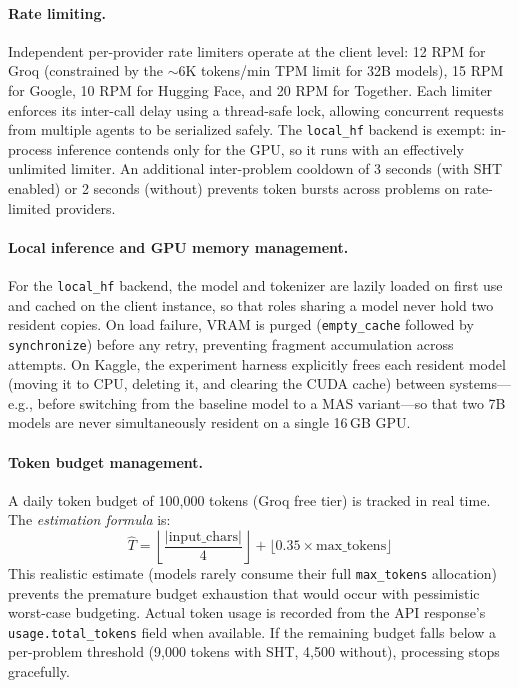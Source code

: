 \documentclass[11pt,a4paper]{article}
\begin{document}
\paragraph{Rate limiting.}
Independent per-provider rate limiters operate at the client level: 12 RPM for Groq (constrained by the $\sim$6K tokens/min TPM limit for 32B models), 15 RPM for Google, 10 RPM for Hugging Face, and 20 RPM for Together.
Each limiter enforces its inter-call delay using a thread-safe lock, allowing concurrent requests from multiple agents to be serialized safely.
The \texttt{local\_hf} backend is exempt: in-process inference contends only for the GPU, so it runs with an effectively unlimited limiter.
An additional inter-problem cooldown of 3 seconds (with SHT enabled) or 2 seconds (without) prevents token bursts across problems on rate-limited providers.
\paragraph{Local inference and GPU memory management.}
For the \texttt{local\_hf} backend, the model and tokenizer are lazily loaded on first use and cached on the client instance, so that roles sharing a model never hold two resident copies.
On load failure, VRAM is purged (\texttt{empty\_cache} followed by \texttt{synchronize}) before any retry, preventing fragment accumulation across attempts.
On Kaggle, the experiment harness explicitly frees each resident model (moving it to CPU, deleting it, and clearing the CUDA cache) between systems---e.g., before switching from the baseline model to a MAS variant---so that two 7B models are never simultaneously resident on a single 16\,GB GPU.
\paragraph{Token budget management.}
A daily token budget of 100,000 tokens (Groq free tier) is tracked in real time.
The \emph{estimation formula} is:
\begin{equation*}
\hat{T} = \left\lfloor \frac{|\text{input\_chars}|}{4} \right\rfloor + \lfloor 0.35 \times \text{max\_tokens} \rfloor
\end{equation*}
This realistic estimate (models rarely consume their full \texttt{max\_tokens} allocation) prevents the premature budget exhaustion that would occur with pessimistic worst-case budgeting.
Actual token usage is recorded from the API response's \texttt{usage.total\_tokens} field when available.
If the remaining budget falls below a per-problem threshold (9,000 tokens with SHT, 4,500 without), processing stops gracefully.
\end{document}
